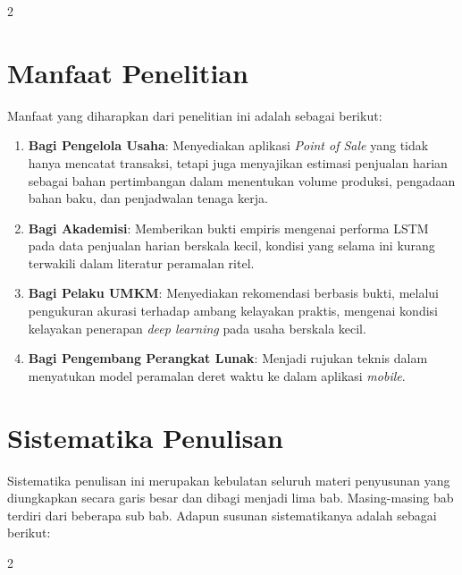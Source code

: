 \documentclass[12pt, a4paper, onecolumn, oneside]{report}
\begin{document}
\begin{spacing}{2}
\section{Manfaat Penelitian}
Manfaat yang diharapkan dari penelitian ini adalah sebagai berikut:
\begin{enumerate}
    \item \textbf{Bagi Pengelola Usaha}: Menyediakan aplikasi \textit{Point of Sale} yang tidak hanya mencatat transaksi, tetapi juga menyajikan estimasi penjualan harian sebagai bahan pertimbangan dalam menentukan volume produksi, pengadaan bahan baku, dan penjadwalan tenaga kerja.
    \item \textbf{Bagi Akademisi}: Memberikan bukti empiris mengenai performa LSTM pada data penjualan harian berskala kecil, kondisi yang selama ini kurang terwakili dalam literatur peramalan ritel.
    \item \textbf{Bagi Pelaku UMKM}: Menyediakan rekomendasi berbasis bukti, melalui pengukuran akurasi terhadap ambang kelayakan praktis, mengenai kondisi kelayakan penerapan \textit{deep learning} pada usaha berskala kecil.
    \item \textbf{Bagi Pengembang Perangkat Lunak}: Menjadi rujukan teknis dalam menyatukan model peramalan deret waktu ke dalam aplikasi \textit{mobile}.
\end{enumerate}

\section{Sistematika Penulisan}
Sistematika penulisan ini merupakan kebulatan seluruh materi penyusunan yang diungkapkan secara garis besar dan dibagi menjadi lima bab. Masing-masing bab terdiri dari beberapa sub bab. Adapun susunan sistematikanya adalah sebagai berikut:

\newcommand{\babsistematika}[3]{%
  \par\noindent
  \begin{tabularx}{\textwidth}{@{}p{2.4cm}@{\hspace{0.5cm}}>{\justifying\arraybackslash\setlength{\parindent}{0pt}}X@{}}
  \textbf{#1} & \textbf{#2}\newline #3
  \end{tabularx}\par\vspace{0.2cm}}
\begin{spacing}{2}
\vspace{0.4cm}


\end{spacing}
\end{spacing}
\end{document}
